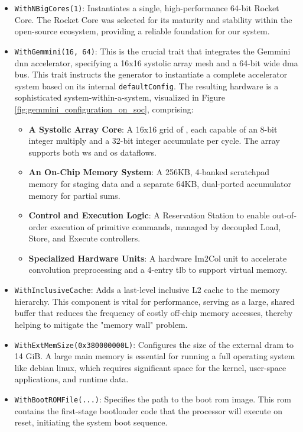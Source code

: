 \begin{itemize}
    \item \texttt{WithNBigCores(1)}: Instantiates a single, high-performance 64-bit Rocket Core. The Rocket Core was selected for its maturity and stability within the open-source ecosystem, providing a reliable foundation for our system.
    \item \texttt{WithGemmini(16, 64)}: This is the crucial trait that integrates the Gemmini \acrshort{dnn} accelerator, specifying a 16x16 systolic array mesh and a 64-bit wide \acrshort{dma} bus. This trait instructs the generator to instantiate a complete accelerator system based on its internal \texttt{defaultConfig}. The resulting hardware is a sophisticated system-within-a-system, visualized in Figure \ref{fig:gemmini_configuration_on_soc}, comprising:
      \begin{itemize}
        \item \textbf{A Systolic Array Core}: A 16x16 grid of , each capable of an 8-bit integer multiply and a 32-bit integer accumulate per cycle. The array supports both \acrfull{ws} and \acrfull{os} dataflows.
        \item \textbf{An On-Chip Memory System}: A 256KB, 4-banked scratchpad memory for staging data and a separate 64KB, dual-ported accumulator memory for partial sums.
        \item \textbf{Control and Execution Logic}: A Reservation Station to enable out-of-order execution of primitive commands, managed by decoupled Load, Store, and Execute controllers.
        \item \textbf{Specialized Hardware Units}: A hardware Im2Col unit to accelerate convolution preprocessing and a 4-entry \acrfull{tlb} to support virtual memory.
      \end{itemize}
    \item \texttt{WithInclusiveCache}: Adds a last-level inclusive L2 cache to the memory hierarchy. This component is vital for performance, serving as a large, shared buffer that reduces the frequency of costly off-chip memory accesses, thereby helping to mitigate the "memory wall" problem.
    \item \texttt{WithExtMemSize(0x380000000L)}: Configures the size of the external \acrshort{dram} to 14 GiB. A large main memory is essential for running a full operating system like \acrshort{debian} \acrshort{linux}, which requires significant space for the kernel, user-space applications, and runtime data.
    \item \texttt{WithBootROMFile(...)}: Specifies the path to the boot \acrshort{rom} image. This \acrshort{rom} contains the first-stage bootloader code that the processor will execute on reset, initiating the system boot sequence.
\end{itemize}

